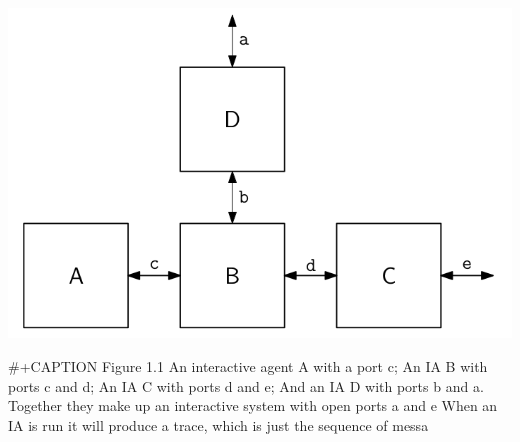 \documentclass[11pt]{article}
\begin{document}
\begin{center}
\includegraphics[width=.9\linewidth]{Introduction (Chapter 1)/screenshot_2018-08-25_17-09-03.png}
\end{center}
\#+CAPTION Figure 1.1 An interactive agent A with a port c; An IA B with ports c and d; An IA C with ports d and e; And an IA D with ports b and a. Together they make up an interactive system with open ports a and e When an IA is run it will produce a trace, which is just the sequence of messa
\end{document}

